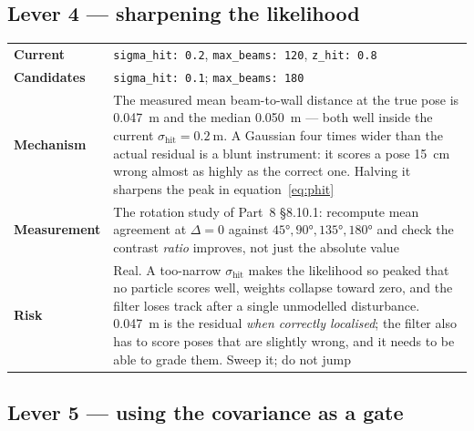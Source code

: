 \documentclass[11pt,a4paper]{report}
\newcommand{\file}[1]{\texttt{\small #1}}
\begin{document}
\subsection{Lever 4 --- sharpening the likelihood}

\begin{center}
\small
\begin{tabular}{@{}p{}p{}@{}}
\toprule
\textbf{Current} & \file{sigma\_hit: 0.2}, \file{max\_beams: 120}, \file{z\_hit: 0.8} \\
\textbf{Candidates} & \file{sigma\_hit: 0.1}; \file{max\_beams: 180} \\
\textbf{Mechanism} & The measured mean beam-to-wall distance at the true pose is
  \SI{0.047}{\metre} and the median \SI{0.050}{\metre} --- both well inside the
  current $\sigma_{\text{hit}} = \SI{0.2}{\metre}$. A Gaussian four times wider
  than the actual residual is a blunt instrument: it scores a pose
  \SI{15}{\centi\metre} wrong almost as highly as the correct one. Halving it
  sharpens the peak in equation~\eqref{eq:phit} \\
\textbf{Measurement} & The rotation study of Part~8 \S8.10.1: recompute mean
  agreement at $\Delta = 0$ against $\ang{45}, \ang{90}, \ang{135}, \ang{180}$
  and check the contrast \emph{ratio} improves, not just the absolute value \\
\textbf{Risk} & Real. A too-narrow $\sigma_{\text{hit}}$ makes the likelihood
  so peaked that no particle scores well, weights collapse toward zero, and the
  filter loses track after a single unmodelled disturbance. \SI{0.047}{\metre}
  is the residual \emph{when correctly localised}; the filter also has to score
  poses that are slightly wrong, and it needs to be able to grade them. Sweep
  it; do not jump \\
\bottomrule
\end{tabular}
\end{center}

\subsection{Lever 5 --- using the covariance as a gate}
\end{document}
